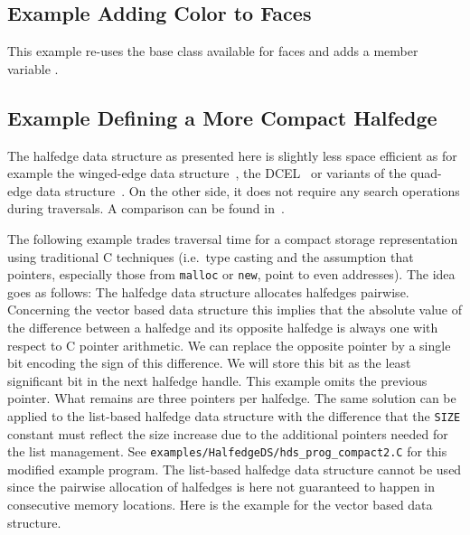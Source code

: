 

\subsection{Example Adding Color to Faces}

This example re-uses the base class available for faces and adds a
member variable .


\subsection{Example Defining a More Compact Halfedge}

\begin{ccAdvanced}
  
The halfedge data structure as presented here is slightly less space
efficient as for example the winged-edge data
structure~\cite{b-prcv-75}, the DCEL~\cite{mp-fitcp-78} or variants of
the quad-edge data structure~\cite{gs-pmgsc-85}.  On the other side,
it does not require any search operations during traversals. A
comparison can be found in~\cite{k-ugpdd-99}.

The following example trades traversal time for a compact storage
representation using traditional C techniques (i.e.~type casting and
the assumption that pointers, especially those from {\tt malloc} or
{\tt new}, point to even addresses). The idea goes as follows: The
halfedge data structure allocates halfedges pairwise.  Concerning the
vector based data structure this implies that the absolute value of
the difference between a halfedge and its opposite halfedge is always
one with respect to C pointer arithmetic. We can replace the opposite
pointer by a single bit encoding the sign of this difference.  We will
store this bit as the least significant bit in the next halfedge
handle.  This example omits the previous pointer. What remains are
three pointers per halfedge. The same solution can be applied to the
list-based halfedge data structure
 with the difference that the
{\tt SIZE} constant must reflect the size increase due to the
additional pointers needed for the list management. See 
\texttt{examples/HalfedgeDS/hds\_prog\_compact2.C} for this modified example
program. The list-based halfedge data structure
 cannot be used since the pairwise
allocation of halfedges is here not guaranteed to happen in
consecutive memory locations. Here is the example for the vector based
data structure.


\end{ccAdvanced}

